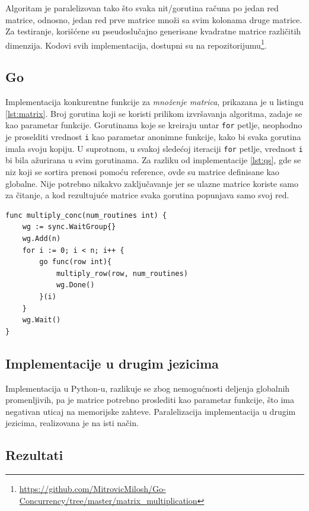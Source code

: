 \documentclass[12pt,oneside]{memoir}
\begin{document}
Algoritam je paralelizovan tako što svaka nit/gorutina računa po jedan red matrice, odnosno, jedan red prve matrice množi sa svim kolonama druge matrice. Za testiranje, korišćene su pseudoslučajno generisane kvadratne matrice različitih dimenzija. Kodovi svih implementacija, dostupni su na repozitorijumu\footnote{\url{https://github.com/MitrovicMilosh/Go-Concurrency/tree/master/matrix_multiplication}}.

\subsection{Go}
Implementacija konkurentne funkcije za \textit{množenje matrica}, prikazana je u listingu \ref{lst:matrix}. Broj gorutina koji se koristi prilikom izvršavanja algoritma, zadaje se kao parametar funkcije. Gorutinama koje se kreiraju untar \texttt{for} petlje, neophodno je proselditi vrednost \texttt{i} kao parametar anonimne funkcije, kako bi svaka gorutina imala svoju kopiju. U suprotnom, u svakoj sledećoj iteraciji \texttt{for} petlje, vrednost \texttt{i} bi bila ažurirana u svim gorutinama. Za razliku od  implementacije \ref{lst:qs}, gde se niz koji se sortira prenosi pomoću reference, ovde su matrice definisane kao globalne. Nije potrebno nikakvo zaključavanje jer se ulazne matrice koriste samo za čitanje, a kod rezultujuće matrice svaka gorutina popunjava samo svoj red. 

\begin{center}
\begin{lstlisting}[caption=Implementacija konkurentne funkcije za \textit{množenje matrica} u jeziku Go,label={lst:matrix}, backgroundcolor=\color{background}]
func multiply_conc(num_routines int) {
	wg := sync.WaitGroup{}
	wg.Add(n)
	for i := 0; i < n; i++ {
		go func(row int){
			multiply_row(row, num_routines)
			wg.Done()
		}(i)
	}
	wg.Wait()
}
\end{lstlisting}
\end{center}

\subsection{Implementacije u drugim jezicima}
Implementacija u Python-u, razlikuje se zbog nemogućnosti deljenja globalnih promenljivih, pa je matrice potrebno proslediti kao parametar funkcije, što ima negativan uticaj na memorijske zahteve. Paralelizacija implementacija u drugim jezicima, realizovana je na isti način. 

\subsection{Rezultati}
\end{document}
